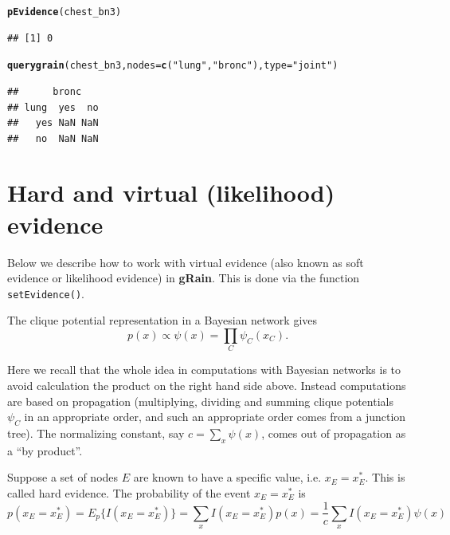 \documentclass[10pt]{article}\usepackage[]{graphicx}\usepackage[]{xcolor}
\makeatletter
\newcommand{\hlstr}[1]{\textcolor[rgb]{0.192,0.494,0.8}{#1}}%
\newcommand{\hlstd}[1]{\textcolor[rgb]{0.345,0.345,0.345}{#1}}%
\newcommand{\hlkwc}[1]{\textcolor[rgb]{0.333,0.667,0.333}{#1}}%
\newcommand{\hlkwd}[1]{\textcolor[rgb]{0.737,0.353,0.396}{\textbf{#1}}}%
\newenvironment{kframe}{%
 \def\at@end@of@kframe{}%
 \ifinner\ifhmode%
  \def\at@end@of@kframe{\end{minipage}}%
  \begin{minipage}{\columnwidth}%
 \fi\fi%
 \def\FrameCommand##1{\hskip\@totalleftmargin \hskip-\fboxsep
 \colorbox{shadecolor}{##1}\hskip-\fboxsep
     \hskip-\linewidth \hskip-\@totalleftmargin \hskip\columnwidth}%
 \MakeFramed {\advance\hsize-\width
   \@totalleftmargin\z@ \linewidth\hsize
   \@setminipage}}%
 {\par\unskip\endMakeFramed%
 \at@end@of@kframe}
\newenvironment{knitrout}{}{} %
\def\grbn{{\bf gRain}}
\def\code#1{{\texttt{#1}}}
\makeatother
\begin{document}
\begin{knitrout}
\color{fgcolor}\begin{kframe}
\begin{alltt}
\hlkwd{pEvidence}\hlstd{(chest_bn3)}
\end{alltt}
\begin{verbatim}
## [1] 0
\end{verbatim}
\begin{alltt}
\hlkwd{querygrain}\hlstd{(chest_bn3,} \hlkwc{nodes}\hlstd{=}\hlkwd{c}\hlstd{(}\hlstr{"lung"}\hlstd{,} \hlstr{"bronc"}\hlstd{),} \hlkwc{type}\hlstd{=}\hlstr{"joint"}\hlstd{)}
\end{alltt}
\begin{verbatim}
##      bronc
## lung  yes  no
##   yes NaN NaN
##   no  NaN NaN
\end{verbatim}
\end{kframe}
\end{knitrout}




\section{Hard  and virtual (likelihood) evidence}
\label{sec:hard-virt-likel}
\label{sec:hard-soft}

Below we describe  how to work with virtual evidence (also known
as soft evidence or likelihood evidence) in \grbn. This is done via the function
\code{setEvidence()}.

The clique potential representation in a Bayesian network gives
\begin{displaymath}
  p(x) \propto \psi(x) = \prod_{C} \psi_C(x_C).
\end{displaymath}

Here we recall that the whole idea in computations with Bayesian
networks is to avoid calculation the product on the right hand
side above. Instead computations are based on propagation (multiplying,
dividing and summing clique potentials $\psi_C$ in an appropriate
order, and such an appropriate order comes from a junction tree).
The normalizing constant, say $c=\sum_x \psi(x)$, comes out of
propagation as a ``by product''.

Suppose a set of nodes $E$ are known to have a specific value,
i.e. $x_E=x^*_E$. This is called hard evidence. The probability of
the event $x_E=x^*_E$ is
\begin{displaymath}
  p(x_E=x^*_E)=E_p\{I(x_E=x^*_E)\} = \sum_x I(x_E=x^*_E) p(x)
  = \frac{1}{c} \sum_x I(x_E=x^*_E) \psi(x)
\end{displaymath}
\end{document}

